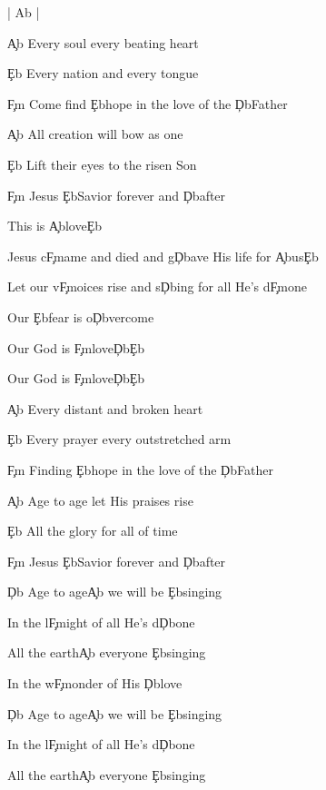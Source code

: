 \documentclass[9pt]{extarticle}
\begin{document}
\bsong

\bi
| Ab |
\ei

\bv
\c{Ab} Every soul every beating heart

\c{Eb} Every nation and every tongue

\c{Fm} Come find \c{Eb}hope in the love of the \c{Db}Father
\ev

\bv
\c{Ab} All creation will bow as one

\c{Eb} Lift their eyes to the risen Son

\c{Fm} Jesus \c{Eb}Savior forever and \c{Db}after
\ev

\bc
This is \c{Ab}love\c{Eb}

Jesus c\c{Fm}ame and died and g\c{Db}ave His life for \c{Ab}us\c{Eb}

Let our v\c{Fm}oices rise and s\c{Db}ing for all He's d\c{Fm}one

Our \c{Eb}fear is o\c{Db}vercome

Our God is \c{Fm}love\c{Db}\c{Eb}

Our God is \c{Fm}love\c{Db}\c{Eb}
\ec

\bv
\c{Ab} Every distant and broken heart

\c{Eb} Every prayer every outstretched arm

\c{Fm} Finding \c{Eb}hope in the love of the \c{Db}Father
\ev

\bv
\c{Ab} Age to age let His praises rise

\c{Eb} All the glory for all of time

\c{Fm} Jesus \c{Eb}Savior forever and \c{Db}after
\ev


\bb
\c{Db} Age to age\c{Ab} we will be \c{Eb}singing

In the l\c{Fm}ight of all He's d\c{Db}one

All the earth\c{Ab} everyone \c{Eb}singing

In the w\c{Fm}onder of His \c{Db}love
\eb

\bb
\c{Db} Age to age\c{Ab} we will be \c{Eb}singing

In the l\c{Fm}ight of all He's d\c{Db}one

All the earth\c{Ab} everyone \c{Eb}singing
\eb


\esong
\end{document}
